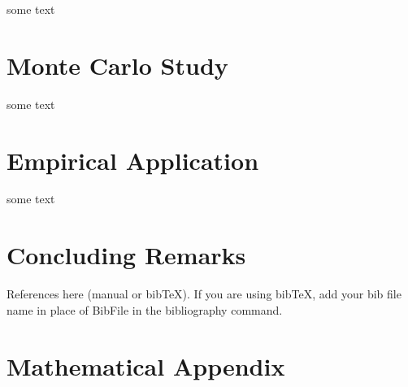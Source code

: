 \documentclass[AER]{AEA}
\begin{document}
	some text
	
	\section{Monte Carlo Study}
	
	some text
	
	\section{Empirical Application}
	
	some text
	
	\section{Concluding Remarks}
	
	References here (manual or bibTeX). If you are using bibTeX, add your bib file 
	name in place of BibFile in the bibliography command.
	
	
	
	\appendix
	
	\section{Mathematical Appendix}
	
\end{document}
